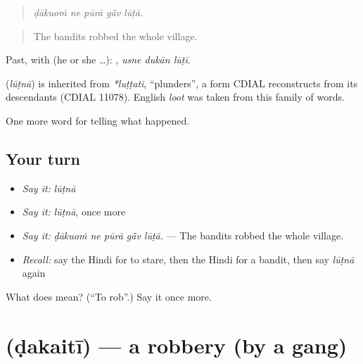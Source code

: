 \begin{quote}
    
\end{quote}

\begin{quote}
\emph{ḍākuoṁ ne pūrā gā̃v lūṭā.}
\end{quote}

\begin{quote}
The bandits robbed the whole village.
\end{quote}

Past, with  (he or she …):   , \emph{usne dukān lūṭī}.

\begin{cousinweb}
\textbf{} (\emph{lūṭnā}) is inherited from \emph{*luṭṭati}, \textquotedblleft{}plunders\textquotedblright{}, a form CDIAL reconstructs from its descendants (CDIAL 11078). English \emph{loot} was taken from this family of words.
\end{cousinweb}

\begin{grammarlens}[title={What you've built}]
One more word for telling what happened.
\end{grammarlens}

\subsection*{Your turn}
\begin{itemize}
\raggedright
  \item \emph{Say it:} \emph{lūṭnā}
  \item \emph{Say it:} \emph{lūṭnā}, once more
  \item \emph{Say it:} \emph{ḍākuoṁ ne pūrā gā̃v lūṭā.} — The bandits robbed the whole village.
  \item \emph{Recall:} say the Hindi for to stare, then the Hindi for a bandit, then say \emph{lūṭnā} again
\end{itemize}

\begin{tcolorbox}[breakable,colback=teal!4,colframe=teal!35!black,title={Before you move on}]
What does  mean? (\textquotedblleft{}To rob\textquotedblright{}.) Say it once more.
\end{tcolorbox}
\section[\texorpdfstring{\hi{डकैती} (ḍakaitī)}{डकैती (ḍakaitī)}]{ (ḍakaitī) — a robbery (by a gang)}

